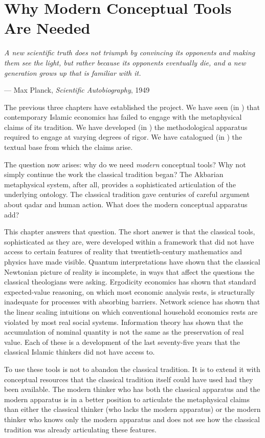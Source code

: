 \chapter{Why Modern Conceptual Tools Are Needed}
\label{ch:modern-tools}

\epigraph{\itshape A new scientific truth does not triumph by
convincing its opponents and making them see the light, but rather
because its opponents eventually die, and a new generation grows up
that is familiar with it.}{--- Max Planck, \textit{Scientific
Autobiography}, 1949}

\noindent
The previous three chapters have established the project. We have
seen (in ) that contemporary Islamic economics
has failed to engage with the metaphysical claims of its tradition.
We have developed (in ) the methodological
apparatus required to engage at varying degrees of rigor. We have
catalogued (in ) the textual base from
which the claims arise.

The question now arises: why do we need \emph{modern} conceptual
tools? Why not simply continue the work the classical tradition
began? The Akbarian metaphysical system, after all, provides a
sophisticated articulation of the underlying ontology. The classical
 tradition gave centuries of careful argument about
qadar and human action. What does the modern conceptual apparatus
add?

This chapter answers that question. The short answer is that the
classical tools, sophisticated as they are, were developed within a
framework that did not have access to certain features of reality
that twentieth-century mathematics and physics have made visible.
Quantum interpretations have shown that the classical Newtonian
picture of reality is incomplete, in ways that affect the questions
the classical theologians were asking. Ergodicity economics has
shown that standard expected-value reasoning, on which most economic
analysis rests, is structurally inadequate for processes with
absorbing barriers. Network science has shown that the linear
scaling intuitions on which conventional household economics rests
are violated by most real social systems. Information theory has
shown that the accumulation of nominal quantity is not the same as
the preservation of real value. Each of these is a development of
the last seventy-five years that the classical Islamic thinkers did
not have access to.

To use these tools is not to abandon the classical tradition. It is
to extend it with conceptual resources that the classical tradition
itself could have used had they been available. The modern thinker
who has both the classical apparatus and the modern apparatus is in
a better position to articulate the metaphysical claims than either
the classical thinker (who lacks the modern apparatus) or the modern
thinker who knows only the modern apparatus and does not see how
the classical tradition was already articulating these features.

